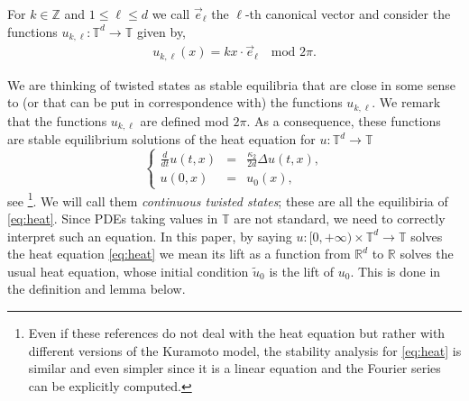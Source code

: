 \documentclass[a4paper,11pt]{amsart}
\newcommand{\red}[1]{{#1}}
\newcommand{\R}{\mathbb{R}}
\newcommand{\T}{\mathbb{T}}
\newcommand{\Z}{\mathbb{Z}}
\numberwithin{equation}{section}
\numberwithin{theorem}{section}
\theoremstyle{definition}
\begin{document}
For $k \in \Z$ and $1 \le \ell \le d$ we call $\vec e_\ell$ the $\ell$-th canonical vector and consider the functions $u_{k,\ell}\colon \T^d \to \T$ given by,
\begin{align}\label{cont-twist}
u_{k,\ell}(x)=kx\cdot \vec e_\ell  \quad \text{mod } 2\pi.
\end{align}

We are thinking of twisted states as stable equilibria that are close in some sense to (or that can be put in correspondence with) the functions $u_{k,\ell}$. \red{We remark that the functions $u_{k,\ell}$ are defined mod $2\pi$. As a consequence, these functions are stable equilibrium solutions of the heat equation} \red{for $u:\T^d\to\T$}
\begin{equation}
\label{eq:heat}
\left\{
\begin{array}{rcl}
\displaystyle{\frac{d}{dt}} u(t,x) & = & \displaystyle{\frac{\kappa_2}{2d}}\Delta u(t,x),\\[10pt]
u(0,x) & = & u_0(x),
\end{array}
\right.
\end{equation}
see \cite{wiley2006size, MedvedevContTwist, MedvedevStability, MedvedevSmallWorld}\footnote{Even if these references do not deal with the heat equation but rather with different versions of the Kuramoto model, the stability analysis for \eqref{eq:heat} is similar and even simpler since it is a linear equation and the Fourier series can be explicitly computed.}. We will call them {\em continuous twisted states}; these are all the equilibiria of \eqref{eq:heat}. \red{Since PDEs taking values in $\T$ are not standard, we need to correctly interpret such an equation. In this paper, by saying $u:[0,+\infty)\times\T^d\to\T$ solves the heat equation \eqref{eq:heat} we mean its lift as a function from $\R^d$ to $\R$ solves the usual heat equation, whose initial condition $\tilde u_0$ is the lift of $u_0$. This is done in the definition and lemma below.}

\end{document}
